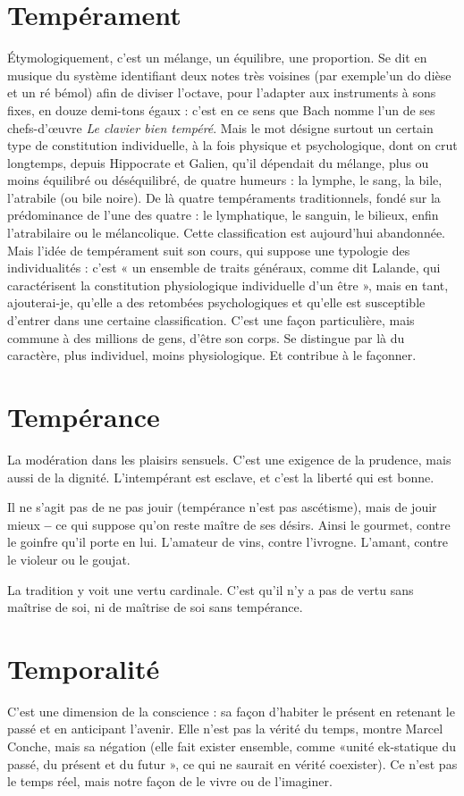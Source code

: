 \section{Tempérament}
Étymologiquement, c’est un mélange, un équilibre, une
proportion. Se dit en musique du système identifiant
deux notes très voisines (par exemple’un do dièse et un ré bémol) afin de
diviser l’octave, pour l’adapter aux instruments à sons fixes, en douze demi-tons
égaux : c’est en ce sens que Bach nomme l’un de ses chefs-d’œuvre {\it Le
clavier bien tempéré}. Mais le mot désigne surtout un certain type de constitution
individuelle, à la fois physique et psychologique, dont on crut longtemps,
depuis Hippocrate et Galien, qu’il dépendait du mélange, plus ou
moins équilibré ou déséquilibré, de quatre humeurs : la lymphe, le sang, la
bile, l’atrabile (ou bile noire). De là quatre tempéraments traditionnels,
fondé sur la prédominance de l’une des quatre : le lymphatique, le sanguin,
le bilieux, enfin l’atrabilaire ou le mélancolique. Cette classification est
aujourd’hui abandonnée. Mais l’idée de tempérament suit son cours, qui
suppose une typologie des individualités : c’est « un ensemble de traits généraux,
comme dit Lalande, qui caractérisent la constitution physiologique
individuelle d’un être », mais en tant, ajouterai-je, qu’elle a des retombées
psychologiques et qu’elle est susceptible d’entrer dans une certaine classification.
C’est une façon particulière, mais commune à des millions de gens,
d’être son corps. Se distingue par là du caractère, plus individuel, moins physiologique.
Et contribue à le façonner.

\section{Tempérance}
La modération dans les plaisirs sensuels. C’est une exigence
de la prudence, mais aussi de la dignité. L’intempérant est
esclave, et c’est la liberté qui est bonne.

Il ne s’agit pas de ne pas jouir (tempérance n’est pas ascétisme), mais de
jouir mieux {\bf --} ce qui suppose qu’on reste maître de ses désirs. Ainsi le gourmet,
contre le goinfre qu’il porte en lui. L’amateur de vins, contre l’ivrogne.
L'amant, contre le violeur ou le goujat.

La tradition y voit une vertu cardinale. C’est qu’il n’y a pas de vertu sans
maîtrise de soi, ni de maîtrise de soi sans tempérance.

\section{Temporalité}
C’est une dimension de la conscience : sa façon d’habiter
le présent en retenant le passé et en anticipant l'avenir.
Elle n’est pas la vérité du temps, montre Marcel Conche, mais sa négation (elle
fait exister ensemble, comme «unité ek-statique du passé, du présent et du
futur », ce qui ne saurait en vérité coexister). Ce n’est pas le temps réel, mais
notre façon de le vivre ou de l’imaginer.

